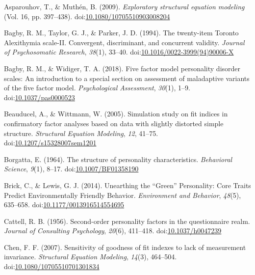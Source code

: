 \documentclass[,man,floatsintext]{apa6}
\theoremstyle{definition}
\theoremstyle{definition}
\theoremstyle{definition}
\theoremstyle{remark}
\begin{document}
\leavevmode\hypertarget{ref-AsparouhovMuthen2009}{}%
Asparouhov, T., \& Muthén, B. (2009). \emph{Exploratory structural
equation modeling} (Vol. 16, pp. 397--438).
doi:\href{https://doi.org/10.1080/10705510903008204}{10.1080/10705510903008204}

\leavevmode\hypertarget{ref-Bagby1994}{}%
Bagby, R. M., Taylor, G. J., \& Parker, J. D. (1994). The twenty-item
Toronto Alexithymia scale-II. Convergent, discriminant, and concurrent
validity. \emph{Journal of Psychosomatic Research}, \emph{38}(1),
33--40.
doi:\href{https://doi.org/10.1016/0022-3999(94)90006-X}{10.1016/0022-3999(94)90006-X}

\leavevmode\hypertarget{ref-Bagby2018}{}%
Bagby, R. M., \& Widiger, T. A. (2018). Five factor model personality
disorder scales: An introduction to a special section on assessment of
maladaptive variants of the five factor model. \emph{Psychological
Assessment}, \emph{30}(1), 1--9.
doi:\href{https://doi.org/10.1037/pas0000523}{10.1037/pas0000523}

\leavevmode\hypertarget{ref-Beauducel2005}{}%
Beauducel, A., \& Wittmann, W. (2005). Simulation study on fit indices
in confirmatory factor analyses based on data with slightly distorted
simple structure. \emph{Structural Equation Modeling}, \emph{12},
41--75.
doi:\href{https://doi.org/10.1207/s15328007sem1201}{10.1207/s15328007sem1201}

\leavevmode\hypertarget{ref-Borgatta1964}{}%
Borgatta, E. (1964). The structure of personality characteristics.
\emph{Behavioral Science}, \emph{9}(1), 8--17.
doi:\href{https://doi.org/10.1007/BF01358190}{10.1007/BF01358190}

\leavevmode\hypertarget{ref-Brick2014}{}%
Brick, C., \& Lewis, G. J. (2014). Unearthing the ``Green'' Personality:
Core Traits Predict Environmentally Friendly Behavior. \emph{Environment
and Behavior}, \emph{48}(5), 635--658.
doi:\href{https://doi.org/10.1177/0013916514554695}{10.1177/0013916514554695}

\leavevmode\hypertarget{ref-Cattell1956}{}%
Cattell, R. B. (1956). Second-order personality factors in the
questionnaire realm. \emph{Journal of Consulting Psychology},
\emph{20}(6), 411--418.
doi:\href{https://doi.org/10.1037/h0047239}{10.1037/h0047239}

\leavevmode\hypertarget{ref-Chen2007}{}%
Chen, F. F. (2007). Sensitivity of goodness of fit indexes to lack of
measurement invariance. \emph{Structural Equation Modeling},
\emph{14}(3), 464--504.
doi:\href{https://doi.org/10.1080/10705510701301834}{10.1080/10705510701301834}
\end{document}
